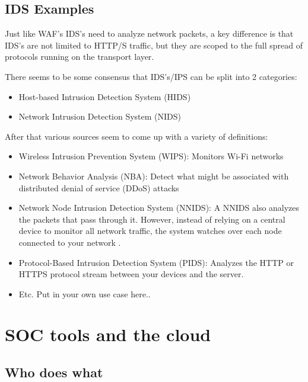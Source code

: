\documentclass[
	letterpaper, %
	10pt, %
	unnumberedsections, %
	twoside, %
]{APAAssignment}
\begin{document}
\subsection{IDS Examples}
Just like WAF's IDS's need to analyze network packets, a key difference is that IDS's are not limited to HTTP/S traffic, but they are scoped to the full spread of protocols running on the transport layer.

There seems to be  some consensus that IDS's/IPS can be split into 2 categories:

\begin{itemize}
	\item Host-based Intrusion Detection System (HIDS)
	\item Network Intrusion Detection System (NIDS)
\end{itemize}

After that various sources seem to come up with a variety of definitions:

\begin{itemize}
	\item Wireless Intrusion Prevention System (WIPS):  Monitors Wi-Fi networks \cite{FortinetIPSdefinitiopns}
	\item Network Behavior Analysis (NBA): Detect what might be associated with distributed denial of service (DDoS) attacks \cite{FortinetIPSdefinitiopns}
	\item Network Node Intrusion Detection System (NNIDS): A NNIDS also analyzes the packets that pass through it. However, instead of relying on a central device to monitor all network traffic, the system watches over each node connected to your network \cite{HelixstormIDSdefinitiopns}.
	\item Protocol-Based Intrusion Detection System (PIDS): Analyzes the HTTP or HTTPS protocol stream between your devices and the server\cite{HelixstormIDSdefinitiopns}.
	\item Etc. Put in your own use case here..
\end{itemize}



\section{SOC tools and the cloud}

\subsection{Who does what}
\end{document}

